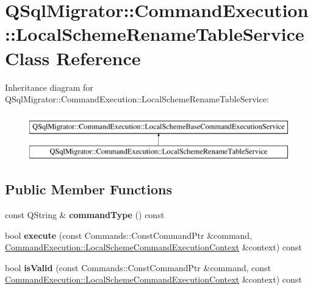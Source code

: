 \hypertarget{class_q_sql_migrator_1_1_command_execution_1_1_local_scheme_rename_table_service}{}\section{Q\+Sql\+Migrator\+:\+:Command\+Execution\+:\+:Local\+Scheme\+Rename\+Table\+Service Class Reference}
\label{class_q_sql_migrator_1_1_command_execution_1_1_local_scheme_rename_table_service}
Inheritance diagram for Q\+Sql\+Migrator\+:\+:Command\+Execution\+:\+:Local\+Scheme\+Rename\+Table\+Service\+:\begin{figure}[H]
\begin{center}
\leavevmode
\includegraphics[height=2.000000cm]{class_q_sql_migrator_1_1_command_execution_1_1_local_scheme_rename_table_service}
\end{center}
\end{figure}
\subsection*{Public Member Functions}
\begin{DoxyCompactItemize}
\item 
\mbox{\label{class_q_sql_migrator_1_1_command_execution_1_1_local_scheme_rename_table_service_a1f377d8485da60c259c1566db68a56a8}} 
const Q\+String \& {\bfseries command\+Type} () const
\item 
\mbox{\label{class_q_sql_migrator_1_1_command_execution_1_1_local_scheme_rename_table_service_a0000c433ea943b060ea3626a2ec6e121}} 
bool {\bfseries execute} (const Commands\+::\+Const\+Command\+Ptr \&command, \hyperlink{class_q_sql_migrator_1_1_command_execution_1_1_local_scheme_command_execution_context}{Command\+Execution\+::\+Local\+Scheme\+Command\+Execution\+Context} \&context) const
\item 
\mbox{\label{class_q_sql_migrator_1_1_command_execution_1_1_local_scheme_rename_table_service_a74439e69a0dad0abdbf18bdbd06cc105}} 
bool {\bfseries is\+Valid} (const Commands\+::\+Const\+Command\+Ptr \&command, const \hyperlink{class_q_sql_migrator_1_1_command_execution_1_1_local_scheme_command_execution_context}{Command\+Execution\+::\+Local\+Scheme\+Command\+Execution\+Context} \&context) const
\end{DoxyCompactItemize}


